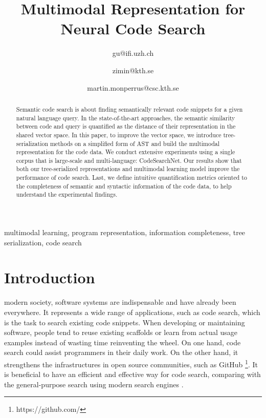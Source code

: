 \documentclass[conference]{IEEEtran}
\begin{document}
\title{Multimodal Representation for Neural Code Search
}

\author{
gu@ifi.uzh.ch
\and
{}
zimin@kth.se
\and
{}
martin.monperrus@csc.kth.se
}

\maketitle
\vspace{-10em}

\begin{abstract}
    Semantic code search is about finding semantically relevant code snippets for a given natural language query. In the state-of-the-art approaches, the semantic similarity between code and query is quantified as the distance of their representation in the shared vector space. In this paper, to improve the vector space, we introduce tree-serialization methods on a simplified form of AST and build the multimodal representation for the code data. We conduct extensive experiments using a single corpus that is large-scale and multi-language: CodeSearchNet. Our results show that both our tree-serialized representations and multimodal learning model improve the performance of code search. Last, we define intuitive quantification metrics oriented to the completeness of semantic and syntactic information of the code data, to help understand the experimental findings.
\end{abstract}

\begin{IEEEkeywords}
multimodal learning, program representation, information completeness, tree serialization, code search
\end{IEEEkeywords}

\section{Introduction}
\label{sec:introduction}

 modern society, software systems are indispensable and have already been everywhere. It represents a wide range of applications, such as code search, which is the task to search existing code snippets. When developing or maintaining software, people tend to reuse existing scaffolds or learn from actual usage examples instead of wasting time reinventing the wheel. On one hand, code search could assist programmers in their daily work. On the other hand, it strengthens the infrastructures in open source communities, such as GitHub \footnote{https://github.com/}. It is beneficial to have an efficient and effective way for code search, comparing with the general-purpose search using modern search engines \cite{Rahman2018EvaluatingHD}.
\end{document}
